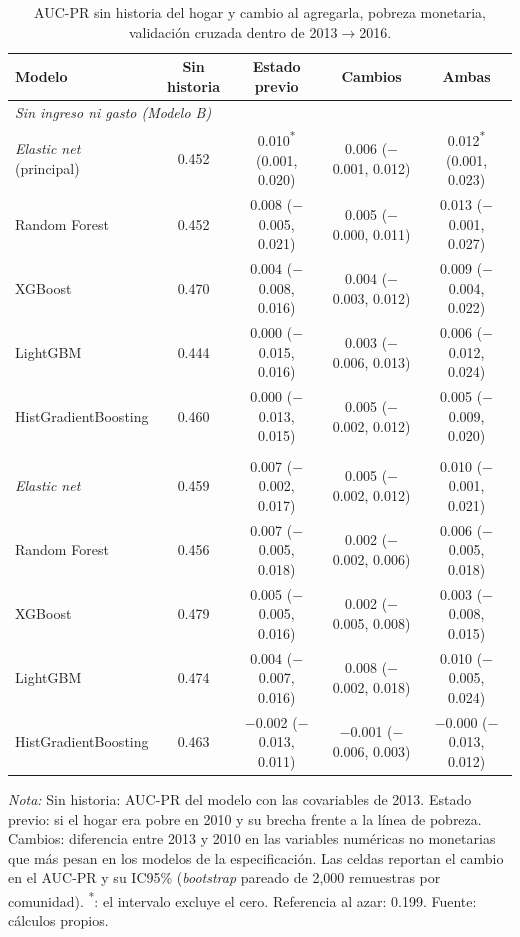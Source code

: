 \begin{table}[H]
  \centering
  \caption{AUC-PR sin historia del hogar y cambio al agregarla, pobreza monetaria,
  validación cruzada dentro de 2013$\to$2016.}
  \label{tab:robustez_historia}
  \footnotesize
  \setlength{\tabcolsep}{4pt}
  \begin{tabular}{l c ccc}
    \toprule
    \textbf{Modelo} & \textbf{Sin historia} & \textbf{Estado previo} & \textbf{Cambios} & \textbf{Ambas} \\
    \midrule
    \multicolumn{5}{l}{\textit{Sin ingreso ni gasto (Modelo B)}} \\
    \quad \emph{Elastic net} (principal) & 0.452 & 0.010\textsuperscript{*} (0.001, 0.020) & 0.006 ($-$0.001, 0.012) & 0.012\textsuperscript{*} (0.001, 0.023) \\
    \quad Random Forest & 0.452 & 0.008 ($-$0.005, 0.021) & 0.005 ($-$0.000, 0.011) & 0.013 ($-$0.001, 0.027) \\
    \quad XGBoost & 0.470 & 0.004 ($-$0.008, 0.016) & 0.004 ($-$0.003, 0.012) & 0.009 ($-$0.004, 0.022) \\
    \quad LightGBM & 0.444 & 0.000 ($-$0.015, 0.016) & 0.003 ($-$0.006, 0.013) & 0.006 ($-$0.012, 0.024) \\
    \quad HistGradientBoosting & 0.460 & 0.000 ($-$0.013, 0.015) & 0.005 ($-$0.002, 0.012) & 0.005 ($-$0.009, 0.020) \\
    \addlinespace
    \multicolumn{5}{l}{\textit{Con ingreso y gasto (Modelo A)}} \\
    \quad \emph{Elastic net} & 0.459 & 0.007 ($-$0.002, 0.017) & 0.005 ($-$0.002, 0.012) & 0.010 ($-$0.001, 0.021) \\
    \quad Random Forest & 0.456 & 0.007 ($-$0.005, 0.018) & 0.002 ($-$0.002, 0.006) & 0.006 ($-$0.005, 0.018) \\
    \quad XGBoost & 0.479 & 0.005 ($-$0.005, 0.016) & 0.002 ($-$0.005, 0.008) & 0.003 ($-$0.008, 0.015) \\
    \quad LightGBM & 0.474 & 0.004 ($-$0.007, 0.016) & 0.008 ($-$0.002, 0.018) & 0.010 ($-$0.005, 0.024) \\
    \quad HistGradientBoosting & 0.463 & $-$0.002 ($-$0.013, 0.011) & $-$0.001 ($-$0.006, 0.003) & $-$0.000 ($-$0.013, 0.012) \\
    \bottomrule
  \end{tabular}
  \begin{minipage}{0.95\textwidth}
    \vspace{4pt}
    \footnotesize \textit{Nota:} Sin historia: AUC-PR del modelo con las covariables de
    2013. Estado previo: si el hogar era pobre en 2010 y su brecha frente a la línea de
    pobreza. Cambios: diferencia entre 2013 y 2010 en las variables numéricas no
    monetarias que más pesan en los modelos de la especificación. Las celdas reportan
    el cambio en el AUC-PR y su IC95\% (\emph{bootstrap} pareado de 2{,}000 remuestras
    por comunidad). \textsuperscript{*}: el intervalo excluye el cero. Referencia al
    azar: 0.199.
    Fuente: cálculos propios.
  \end{minipage}
\end{table}
